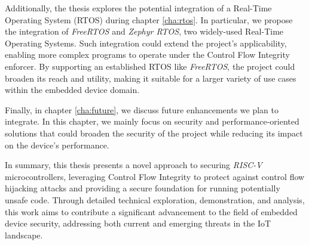Additionally, the thesis explores the potential integration of a Real-Time Operating
System (RTOS) during chapter \ref{cha:rtos}. In particular, we propose the integration
of \textit{FreeRTOS} and \textit{Zephyr RTOS}, two widely-used Real-Time
Operating Systems. Such integration could extend the project's applicability,
enabling more complex programs to operate under the Control Flow Integrity
enforcer. By supporting an established RTOS like \textit{FreeRTOS}, the project could
broaden its reach and utility, making it suitable for a larger variety of use
cases within the embedded device domain.

Finally, in chapter \ref{cha:future}, we discuss future enhancements we plan to
integrate. In this chapter, we mainly focus on security and performance-oriented
solutions that could broaden the security of the project while reducing its
impact on the device's performance.

In summary, this thesis presents a novel approach to securing \textit{RISC-V}
microcontrollers, leveraging Control Flow Integrity to protect against control flow
hijacking attacks and providing a secure foundation for running potentially unsafe
code. Through detailed technical exploration, demonstration, and analysis, this work
aims to contribute a significant advancement to the field of embedded device security,
addressing both current and emerging threats in the IoT landscape.
